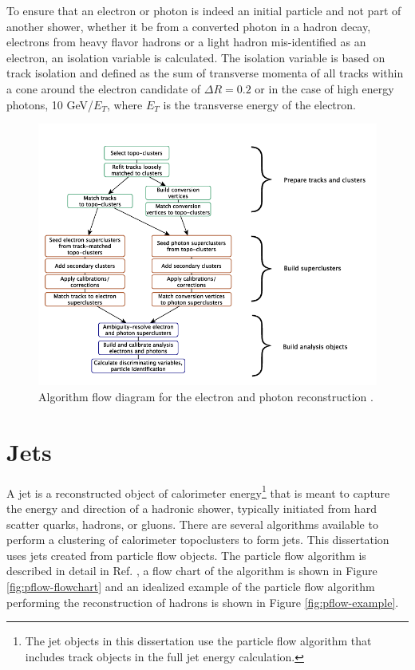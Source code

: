 		To ensure that an electron or photon is indeed an initial particle and not part of another shower, whether it be from a converted photon in a hadron decay, electrons from heavy flavor hadrons or a light hadron mis-identified as an electron, an isolation variable is calculated. The isolation variable is based on track isolation and defined as the sum of transverse momenta of all tracks within a cone around the electron candidate of $\Delta R = 0.2$ or in the case of high energy photons, 10 GeV/$E_T$, where $E_T$ is the transverse energy of the electron.

		\begin{figure}[!ht]
		\centering
		\includegraphics[width=.65\textwidth,keepaspectratio=true]{chapters/chapter5_eventreconnstruction/images/egamma_flow_01.png}
		\caption{\label{fig:egamma-reco} Algorithm flow diagram for the electron and photon reconstruction \cite{electron-perf}.}
		\end{figure}

	\section{Jets}\label{sec:reco-jets}
		A jet is a reconstructed object of calorimeter energy\footnote{The jet objects in this dissertation use the particle flow algorithm that includes track objects in the full jet energy calculation.} that is meant to capture the energy and direction of a hadronic shower, typically initiated from hard scatter quarks, hadrons, or gluons. There are several algorithms available to perform a clustering of calorimeter topoclusters to form jets. This dissertation uses jets created from particle flow objects. The particle flow algorithm is described in detail in Ref. \cite{pflow}, a flow chart of the algorithm is shown in Figure \ref{fig:pflow-flowchart} and an idealized example of the particle flow algorithm performing the reconstruction of hadrons is shown in Figure \ref{fig:pflow-example}. 

